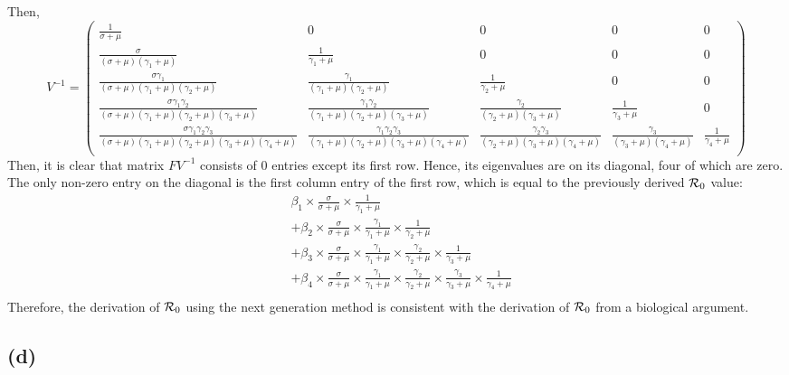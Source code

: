 \documentclass{article}
\begin{document}
Then,
$$
V^{-1} = \begin{pmatrix}
\frac{1}{\sigma + \mu} & 0 & 0 & 0 & 0\\
\frac{\sigma}{(\sigma + \mu)(\gamma_1 + \mu)} & \frac{1}{\gamma_1 + \mu} & 0 & 0 & 0\\
\frac{\sigma \gamma_1}{(\sigma + \mu)(\gamma_1 + \mu)(\gamma_2 + \mu)} & \frac{\gamma_1}{(\gamma_1 + \mu)(\gamma_2 + \mu)} & \frac{1}{\gamma_2 + \mu} & 0 & 0\\
\frac{\sigma \gamma_1 \gamma_2}{(\sigma + \mu)(\gamma_1 + \mu)(\gamma_2 + \mu)(\gamma_3 + \mu)} & \frac{\gamma_1 \gamma_2}{(\gamma_1 + \mu)(\gamma_2 + \mu)(\gamma_3 + \mu)} & \frac{\gamma_2}{(\gamma_2 + \mu)(\gamma_3 + \mu)} & \frac{1}{\gamma_3 + \mu} & 0\\
\frac{\sigma \gamma_1 \gamma_2 \gamma_3}{(\sigma + \mu)(\gamma_1 + \mu)(\gamma_2 + \mu)(\gamma_3 + \mu)(\gamma_4  +\mu)} & \frac{\gamma_1 \gamma_2 \gamma_3}{(\gamma_1 + \mu)(\gamma_2 + \mu)(\gamma_3 + \mu)(\gamma_4  +\mu)} & \frac{\gamma_2 \gamma_3}{(\gamma_2 + \mu)(\gamma_3 + \mu)(\gamma_4  +\mu)} & \frac{\gamma_3}{(\gamma_3 + \mu)(\gamma_4  +\mu)} & \frac{1}{\gamma_4  +\mu}\\
\end{pmatrix}
$$
Then, it is clear that matrix $FV^{-1}$ consists of 0 entries except its first row.
Hence, its eigenvalues are on its diagonal, four of which are zero. The only non-zero entry on the diagonal is the first column entry of the first row, which is equal to the previously derived ${\cal R}_0$ value:
$$
\begin{aligned}
&\beta_1 \times \frac{\sigma}{\sigma + \mu} \times \frac{1}{\gamma_1 + \mu}\\
&+ \beta_2 \times \frac{\sigma}{\sigma + \mu} \times \frac{\gamma_1}{\gamma_1 + \mu} \times \frac{1}{\gamma_2 + \mu}\\
&+ \beta_3 \times \frac{\sigma}{\sigma + \mu} \times \frac{\gamma_1}{\gamma_1 + \mu} \times \frac{\gamma_2}{\gamma_2 + \mu} \times \frac{1}{\gamma_3 + \mu}\\
&+ \beta_4 \times \frac{\sigma}{\sigma + \mu} \times \frac{\gamma_1}{\gamma_1 + \mu} \times \frac{\gamma_2}{\gamma_2 + \mu} \times \frac{\gamma_3}{\gamma_3 + \mu} \times \frac{1}{\gamma_4 + \mu}\\
\end{aligned}
$$
Therefore, the derivation of ${\cal R}_0$ using the next generation method is consistent with the derivation of ${\cal R}_0$ from a biological argument.

\subsection*{(d)}
\end{document}
